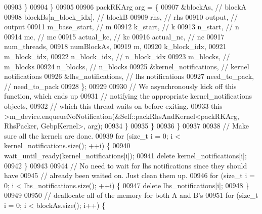 \begin{DoxyCode}
{00903             \}
00904           \}
00905 
00906           packRKArg arg = \{
00907             &blockAs, \textcolor{comment}{// blockA}
00908             blockBs[n\_block\_idx], \textcolor{comment}{// blockB}
00909             rhs,          \textcolor{comment}{// rhs}
00910             output,       \textcolor{comment}{// output}
00911             m\_base\_start, \textcolor{comment}{// m}
00912             k\_start,      \textcolor{comment}{// k}
00913             n\_start,      \textcolor{comment}{// n}
00914             mc,           \textcolor{comment}{// mc}
00915             actual\_kc,    \textcolor{comment}{// kc}
00916             actual\_nc,    \textcolor{comment}{// nc}
00917             num\_threads,
00918             numBlockAs,
00919             m,
00920             k\_block\_idx,
00921             m\_block\_idx,
00922             n\_block\_idx, \textcolor{comment}{// n\_block\_idx}
00923             m\_blocks, \textcolor{comment}{// m\_blocks}
00924             n\_blocks, \textcolor{comment}{// n\_blocks}
00925             &kernel\_notifications, \textcolor{comment}{// kernel notifications}
00926             &lhs\_notifications,    \textcolor{comment}{// lhs notifications}
00927             need\_to\_pack, \textcolor{comment}{// need\_to\_pack}
00928           \};
00929 
00930           \textcolor{comment}{// We asynchronously kick off this function, which ends up}
00931           \textcolor{comment}{// notifying the appropriate kernel\_notifications objects,}
00932           \textcolor{comment}{// which this thread waits on before exiting.}
00933           this->m\_device.enqueueNoNotification(&Self::packRhsAndKernel<packRKArg, RhsPacker, GebpKernel>, 
      arg);
00934         \}
00935       \}
00936     \}
00937 
00938     \textcolor{comment}{// Make sure all the kernels are done.}
00939     \textcolor{keywordflow}{for} (\textcolor{keywordtype}{size\_t} i = 0; i < kernel\_notifications.size(); ++i) \{
00940       wait\_until\_ready(kernel\_notifications[i]);
00941       \textcolor{keyword}{delete} kernel\_notifications[i];
00942     \}
00943 
00944     \textcolor{comment}{// No need to wait for lhs notifications since they should have}
00945     \textcolor{comment}{// already been waited on.  Just clean them up.}
00946     \textcolor{keywordflow}{for} (\textcolor{keywordtype}{size\_t} i = 0; i < lhs\_notifications.size(); ++i) \{
00947       \textcolor{keyword}{delete} lhs\_notifications[i];
00948     \}
00949 
00950     \textcolor{comment}{// deallocate all of the memory for both A and B's}
00951     \textcolor{keywordflow}{for} (\textcolor{keywordtype}{size\_t} i = 0; i < blockAs.size(); i++) \{
}
\end{DoxyCode}
